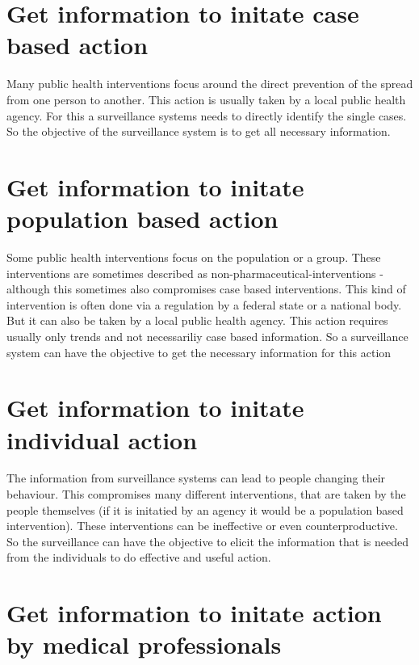 \documentclass[
  letterpaper,
  DIV=11,
  numbers=noendperiod]{scrreprt}
\begin{document}
\section{Get information to initate case based
action}\label{get-information-to-initate-case-based-action}

Many public health interventions focus around the direct prevention of
the spread from one person to another. This action is usually taken by a
local public health agency. For this a surveillance systems needs to
directly identify the single cases. So the objective of the surveillance
system is to get all necessary information.

\section{Get information to initate population based
action}\label{get-information-to-initate-population-based-action}

Some public health interventions focus on the population or a group.
These interventions are sometimes described as
non-pharmaceutical-interventions - although this sometimes also
compromises case based interventions. This kind of intervention is often
done via a regulation by a federal state or a national body. But it can
also be taken by a local public health agency. This action requires
usually only trends and not necessariliy case based information. So a
surveillance system can have the objective to get the necessary
information for this action

\section{Get information to initate individual
action}\label{get-information-to-initate-individual-action}

The information from surveillance systems can lead to people changing
their behaviour. This compromises many different interventions, that are
taken by the people themselves (if it is initatied by an agency it would
be a population based intervention). These interventions can be
ineffective or even counterproductive. So the surveillance can have the
objective to elicit the information that is needed from the individuals
to do effective and useful action.

\section{Get information to initate action by medical
professionals}\label{get-information-to-initate-action-by-medical-professionals}
\end{document}
